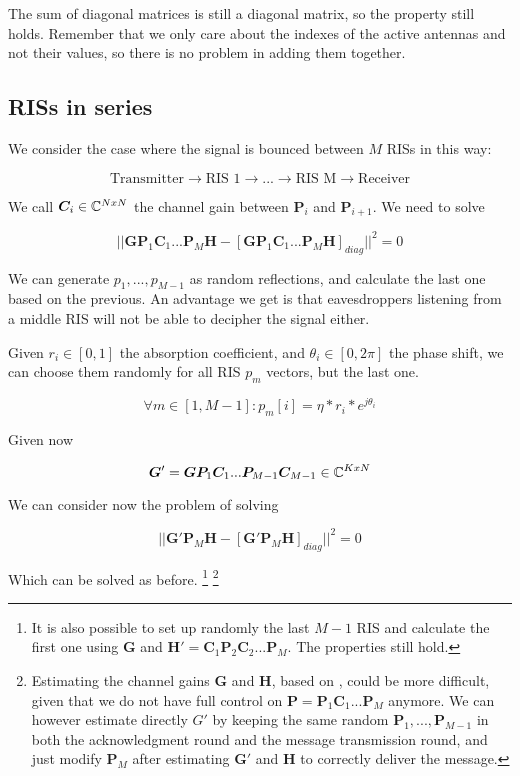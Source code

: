 The sum of diagonal matrices is still a diagonal matrix, so the property still holds. Remember that we only care about the indexes of the active antennas and not their values, so there is no problem in adding them together.

\subsection{RISs in series}

We consider the case where the signal is bounced between $M$ RISs in this way:

\begin{equation}
  \text{Transmitter} \rightarrow \text{RIS 1} \rightarrow ... \rightarrow \text{RIS M} \rightarrow \text{Receiver}
\end{equation}

We call $\bm{C}_i \in \mathbb{C}^{NxN}$ the channel gain between $\bm{P}_i$ and $\bm{P}_{i+1}$. We need to solve

\begin{equation}
  || \bm{GP}_1\bm{C}_1...\bm{P}_M\bm{H} - [\bm{GP}_1\bm{C}_1...\bm{P}_M\bm{H}]_{diag} || ^2 = 0
\end{equation}

We can generate $p_1, ..., p_{M-1}$ as random reflections, and calculate the last one based on the previous. An advantage we get is that eavesdroppers listening from a middle RIS will not be able to decipher the signal either.

Given $r_i \in [0, 1]$ the absorption coefficient, and $\theta_i \in [0, 2\pi]$ the phase shift, we can choose them randomly for all RIS $p_m$ vectors, but the last one.

\begin{equation}
  \forall m \in [1, M-1] : p_m[i] = \eta * r_i * e^{j\theta_i}
\end{equation}

Given now

\begin{equation}
  \bm{G}' = \bm{GP}_1\bm{C}_1...\bm{P}_{M-1}\bm{C}_{M-1} \in \mathbb{C}^{KxN}
\end{equation}

We can consider now the problem of solving

\begin{equation}
  || \bm{G}'\bm{P}_M\bm{H} - [\bm{G}'\bm{P}_M\bm{H}]_{diag} || ^2 = 0
\end{equation}

Which can be solved as before.
\footnote{It is also possible to set up randomly the last $M-1$ RIS and calculate the first one using $\bm{G}$ and $\bm{H}'=\bm{C}_1\bm{P}_2\bm{C}_2...\bm{P}_M$. The properties still hold.}
\footnote{Estimating the channel gains $\bm{G}$ and $\bm{H}$, based on \cite{8879620}, could be more difficult, given that we do not have full control on $\bm{P}=\bm{P}_1\bm{C}_1...\bm{P}_M$ anymore. We can however estimate directly $G'$ by keeping the same random $\bm{P}_1, ..., \bm{P}_{M-1}$ in both the acknowledgment round and the message transmission round, and just modify $\bm{P}_M$ after estimating $\bm{G}'$ and $\bm{H}$ to correctly deliver the message.}

